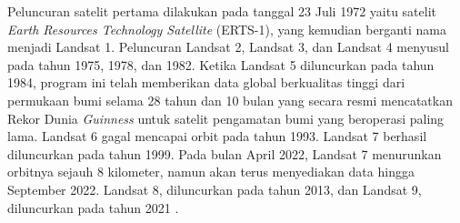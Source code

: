 \hspace{25pt}Peluncuran satelit pertama dilakukan pada tanggal 23 Juli 1972 yaitu satelit \textit{Earth Resources Technology Satellite} (ERTS-1), yang kemudian berganti nama menjadi Landsat 1. Peluncuran Landsat 2, Landsat 3, dan Landsat 4 menyusul pada tahun 1975, 1978, dan 1982. Ketika Landsat 5 diluncurkan pada tahun 1984, program ini telah memberikan data global berkualitas tinggi dari permukaan bumi selama 28 tahun dan 10 bulan yang secara resmi mencatatkan Rekor Dunia \textit{Guinness} untuk satelit pengamatan bumi yang beroperasi paling lama. Landsat 6 gagal mencapai orbit pada tahun 1993. Landsat 7 berhasil diluncurkan pada tahun 1999. Pada bulan April 2022, Landsat 7 menurunkan orbitnya sejauh 8 kilometer, namun akan terus menyediakan data hingga September 2022. Landsat 8, diluncurkan pada tahun 2013, dan Landsat 9, diluncurkan pada tahun 2021 \citep{USGS2022}.

